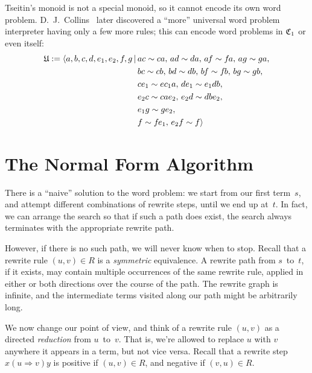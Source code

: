 \documentclass[../generics]{subfiles}
\begin{document}
Tseitin's monoid is not a special monoid, so it cannot encode its own word problem. D.~J.~Collins~\cite{universalsemigroup} later discovered a ``more'' universal word problem interpreter having only a few more rules; this can encode word problems in $\mathfrak{C}_1$ or even itself:
\begin{align*}
\mathfrak{U} := \langle  a,b,c,d,e_1,e_2,f\hspace{-0.08em} ,g\,|\,&ac\sim ca,\,ad\sim da,\,a\hspace{-0.08em} f\sim f\hspace{-0.08em} a,\,ag\sim ga,\\
&bc\sim cb,\, bd\sim db,\, b\hspace{-0.08em} f\sim f\hspace{-0.08em} b,\, bg\sim gb,\\
&ce_1\sim ec_1a,\, de_1\sim e_1db,\\
&e_2c\sim cae_2,\, e_2d\sim dbe_2,\\
&e_1g\sim ge_2,\\
&f\sim f\hspace{-0.08em} e_1,\, e_2f\sim f\rangle
\end{align*}

\section{The Normal Form Algorithm}\label{rewritesystemintro}

There is a ``naive'' solution to the word problem: we start from our first term~$s$, and attempt different combinations of rewrite steps, until we end up at~$t$. In fact, we can arrange the search so that if such a path does exist, the search always terminates with the appropriate rewrite path.

However, if there is no such path, we will never know when to stop. Recall that a rewrite rule $(u, v)\in R$ is a \emph{symmetric} equivalence. A rewrite path from $s$~to~$t$, if it exists, may contain multiple occurrences of the same rewrite rule, applied in either or both directions over the course of the path. The rewrite graph is infinite, and the intermediate terms visited along our path might be arbitrarily long.

\begin{center}
\end{center}

We now change our point of view, and think of a rewrite rule $(u,v)$ as a directed \emph{reduction} from $u$~to~$v$. That is, we're allowed to replace $u$ with $v$ anywhere it appears in a term, but not vice versa. Recall that a rewrite step $x(u\Rightarrow v)y$ is positive if $(u,v)\in R$, and negative if $(v,u)\in R$.
\end{document}
